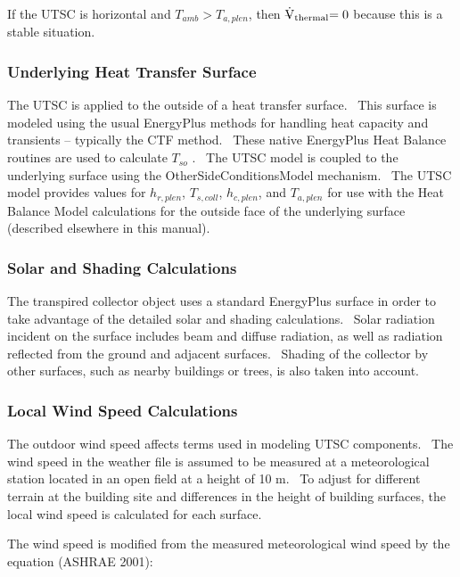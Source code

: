 If the UTSC is horizontal and \({T_{amb}} > {T_{a,plen}}\), then \({{\rm{\rlap{--} \dot V}}_{{\rm{thermal}}}}{\rm{ = 0}}\) because this is a stable situation.

\subsubsection{Underlying Heat Transfer Surface}\label{underlying-heat-transfer-surface-000}

The UTSC is applied to the outside of a heat transfer surface.~ This surface is modeled using the usual EnergyPlus methods for handling heat capacity and transients -- typically the CTF method.~ These native EnergyPlus Heat Balance routines are used to calculate \({T_{so}}\) .~ The UTSC model is coupled to the underlying surface using the OtherSideConditionsModel mechanism.~ The UTSC model provides values for \({h_{r,plen}}\), \({T_{s,coll}}\), \({h_{c,plen}}\), and \({T_{a,plen}}\) for use with the Heat Balance Model calculations for the outside face of the underlying surface (described elsewhere in this manual).

\subsubsection{Solar and Shading Calculations}\label{solar-and-shading-calculations-2}

The transpired collector object uses a standard EnergyPlus surface in order to take advantage of the detailed solar and shading calculations.~ Solar radiation incident on the surface includes beam and diffuse radiation, as well as radiation reflected from the ground and adjacent surfaces.~ Shading of the collector by other surfaces, such as nearby buildings or trees, is also taken into account.

\subsubsection{Local Wind Speed Calculations}\label{local-wind-speed-calculations-000}

The outdoor wind speed affects terms used in modeling UTSC components.~ The wind speed in the weather file is assumed to be measured at a meteorological station located in an open field at a height of 10 m.~ To adjust for different terrain at the building site and differences in the height of building surfaces, the local wind speed is calculated for each surface.

The wind speed is modified from the measured meteorological wind speed by the equation (ASHRAE 2001):

